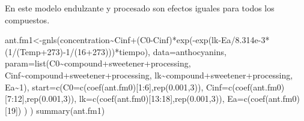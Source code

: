 \documentclass[
]{article}
\newenvironment{Shaded}{\begin{snugshade}}{\end{snugshade}}
\newcommand{\AttributeTok}[1]{\textcolor[rgb]{0.77,0.63,0.00}{#1}}
\newcommand{\DecValTok}[1]{\textcolor[rgb]{0.00,0.00,0.81}{#1}}
\newcommand{\FloatTok}[1]{\textcolor[rgb]{0.00,0.00,0.81}{#1}}
\newcommand{\FunctionTok}[1]{\textcolor[rgb]{0.00,0.00,0.00}{#1}}
\newcommand{\NormalTok}[1]{#1}
\newcommand{\OtherTok}[1]{\textcolor[rgb]{0.56,0.35,0.01}{#1}}
\newcommand{\SpecialCharTok}[1]{\textcolor[rgb]{0.00,0.00,0.00}{#1}}
\begin{document}
En este modelo endulzante y procesado son efectos iguales para todos los
compuestos.

\begin{Shaded}
\begin{Highlighting}[]
\NormalTok{ant.fm1}\OtherTok{\textless{}{-}}\FunctionTok{gnls}\NormalTok{(concentration}\SpecialCharTok{\textasciitilde{}}\NormalTok{Cinf}\SpecialCharTok{+}\NormalTok{(C0}\SpecialCharTok{{-}}\NormalTok{Cinf)}\SpecialCharTok{*}\FunctionTok{exp}\NormalTok{(}\SpecialCharTok{{-}}\FunctionTok{exp}\NormalTok{(lk}\SpecialCharTok{{-}}\NormalTok{Ea}\SpecialCharTok{/}\FloatTok{8.314e{-}3}\SpecialCharTok{*}\NormalTok{(}\DecValTok{1}\SpecialCharTok{/}\NormalTok{(Temp}\SpecialCharTok{+}\DecValTok{273}\NormalTok{)}\SpecialCharTok{{-}}\DecValTok{1}\SpecialCharTok{/}\NormalTok{(}\DecValTok{16}\SpecialCharTok{+}\DecValTok{273}\NormalTok{)))}\SpecialCharTok{*}\NormalTok{tiempo),}
              \AttributeTok{data=}\NormalTok{anthocyanins,}
              \AttributeTok{param=}\FunctionTok{list}\NormalTok{(C0}\SpecialCharTok{\textasciitilde{}}\NormalTok{compound}\SpecialCharTok{+}\NormalTok{sweetener}\SpecialCharTok{+}\NormalTok{processing,}
\NormalTok{                         Cinf}\SpecialCharTok{\textasciitilde{}}\NormalTok{compound}\SpecialCharTok{+}\NormalTok{sweetener}\SpecialCharTok{+}\NormalTok{processing,}
\NormalTok{                         lk}\SpecialCharTok{\textasciitilde{}}\NormalTok{compound}\SpecialCharTok{+}\NormalTok{sweetener}\SpecialCharTok{+}\NormalTok{processing,}
\NormalTok{                         Ea}\SpecialCharTok{\textasciitilde{}}\DecValTok{1}\NormalTok{),}
              \AttributeTok{start=}\FunctionTok{c}\NormalTok{(}\AttributeTok{C0=}\FunctionTok{c}\NormalTok{(}\FunctionTok{coef}\NormalTok{(ant.fm0)[}\DecValTok{1}\SpecialCharTok{:}\DecValTok{6}\NormalTok{],}\FunctionTok{rep}\NormalTok{(}\FloatTok{0.001}\NormalTok{,}\DecValTok{3}\NormalTok{)),}
                      \AttributeTok{Cinf=}\FunctionTok{c}\NormalTok{(}\FunctionTok{coef}\NormalTok{(ant.fm0)[}\DecValTok{7}\SpecialCharTok{:}\DecValTok{12}\NormalTok{],}\FunctionTok{rep}\NormalTok{(}\FloatTok{0.001}\NormalTok{,}\DecValTok{3}\NormalTok{)),}
                      \AttributeTok{lk=}\FunctionTok{c}\NormalTok{(}\FunctionTok{coef}\NormalTok{(ant.fm0)[}\DecValTok{13}\SpecialCharTok{:}\DecValTok{18}\NormalTok{],}\FunctionTok{rep}\NormalTok{(}\FloatTok{0.001}\NormalTok{,}\DecValTok{3}\NormalTok{)),}
                      \AttributeTok{Ea=}\FunctionTok{c}\NormalTok{(}\FunctionTok{coef}\NormalTok{(ant.fm0)[}\DecValTok{19}\NormalTok{])}
\NormalTok{                      )}
\NormalTok{)}
\FunctionTok{summary}\NormalTok{(ant.fm1)}
\end{Highlighting}
\end{Shaded}
\end{document}
